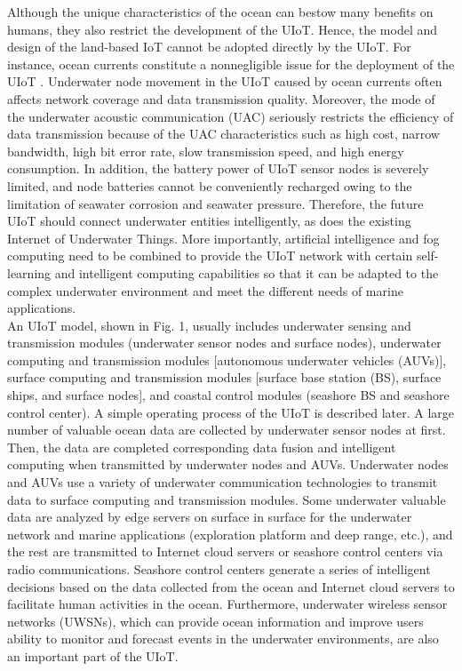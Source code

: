 \documentclass[a4paper,12pt]{article}
\begin{document}
\begin{multicols}{2}
Although the unique characteristics of the ocean can bestow many benefits on humans, they also restrict the development of the UIoT. Hence, the model and design of the land-based IoT cannot be adopted directly by the UIoT. For instance, ocean currents constitute a nonnegligible issue for the deployment of the UIoT . Underwater node movement in the UIoT caused by ocean currents often affects network coverage and data transmission quality. Moreover, the mode of the underwater acoustic communication (UAC) seriously restricts the efficiency of data transmission because of the UAC characteristics such as high cost, narrow bandwidth, high bit error rate, slow transmission speed, and high energy consumption. In addition, the battery power of UIoT sensor nodes is severely limited, and node batteries cannot be conveniently recharged owing to the limitation of seawater corrosion and seawater pressure. Therefore, the future UIoT should connect underwater entities intelligently, as does the existing Internet of Underwater Things. More importantly, artificial intelligence and fog computing need to be combined to provide the UIoT network with certain self-learning and intelligent computing capabilities so that it can be adapted to the complex underwater environment and meet the different needs of marine applications. \\

An UIoT model, shown in Fig. 1, usually includes underwater sensing and transmission modules (underwater sensor nodes and surface nodes), underwater computing and transmission modules [autonomous underwater vehicles (AUVs)], surface computing and transmission modules [surface base station (BS), surface ships, and surface nodes], and coastal control modules (seashore BS and seashore control center). A simple operating process of the UIoT is described later. A large number of valuable ocean data are collected by underwater sensor nodes at first. Then, the data are completed corresponding data fusion and intelligent computing when transmitted by underwater nodes and AUVs. Underwater nodes and AUVs use a variety of underwater communication technologies to transmit data to surface computing and transmission modules. Some underwater valuable data are analyzed by edge servers on surface in surface for the underwater network and marine applications (exploration platform and deep range, etc.), and the rest are transmitted to Internet cloud servers or seashore control centers via radio communications. Seashore control centers generate a series of intelligent decisions based on the data collected from the ocean and Internet cloud servers to facilitate human activities in the ocean. Furthermore, underwater wireless sensor networks (UWSNs), which can provide ocean information and improve users ability to monitor and forecast events in the underwater environments, are also an important part of the UIoT.\\


\end{multicols}
\end{document}
